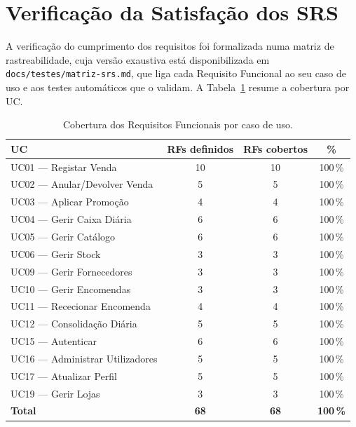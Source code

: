 \section{Verificação da Satisfação dos SRS}
\label{sec:cap6_srs}

    A verificação do cumprimento dos requisitos foi formalizada numa matriz de rastreabilidade, cuja versão exaustiva está disponibilizada em \texttt{docs/testes/matriz-srs.md}, que liga cada Requisito Funcional ao seu caso de uso e aos testes automáticos que o validam. A Tabela~\ref{tab:srs_cobertura} resume a cobertura por UC.

    \begin{table}[H]
    \centering
    \small
    \begin{tabular}{|p{6cm}|c|c|c|}
    \hline
    \textbf{UC} & \textbf{RFs definidos} & \textbf{RFs cobertos} & \textbf{\%} \\
    \hline
    UC01 --- Registar Venda             & 10 & 10 & 100\,\% \\
    \hline
    UC02 --- Anular/Devolver Venda      & 5  & 5  & 100\,\% \\
    \hline
    UC03 --- Aplicar Promoção           & 4  & 4  & 100\,\% \\
    \hline
    UC04 --- Gerir Caixa Diária         & 6  & 6  & 100\,\% \\
    \hline
    UC05 --- Gerir Catálogo             & 6  & 6  & 100\,\% \\
    \hline
    UC06 --- Gerir Stock                & 3  & 3  & 100\,\% \\
    \hline
    UC09 --- Gerir Fornecedores         & 3  & 3  & 100\,\% \\
    \hline
    UC10 --- Gerir Encomendas           & 3  & 3  & 100\,\% \\
    \hline
    UC11 --- Rececionar Encomenda       & 4  & 4  & 100\,\% \\
    \hline
    UC12 --- Consolidação Diária        & 5  & 5  & 100\,\% \\
    \hline
    UC15 --- Autenticar                 & 6  & 6  & 100\,\% \\
    \hline
    UC16 --- Administrar Utilizadores   & 5  & 5  & 100\,\% \\
    \hline
    UC17 --- Atualizar Perfil           & 5  & 5  & 100\,\% \\
    \hline
    UC19 --- Gerir Lojas                & 3  & 3  & 100\,\% \\
    \hline
    \textbf{Total}                      & \textbf{68} & \textbf{68} & \textbf{100\,\%} \\
    \hline
    \end{tabular}
    \caption{Cobertura dos Requisitos Funcionais por caso de uso.}
    \label{tab:srs_cobertura}
    \end{table}

